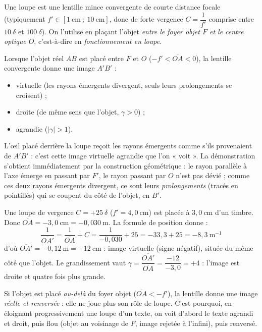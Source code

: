 \documentclass[11pt]{article}
\newcommand{\cle}[1]{{\popxbold\color{popdark}#1}}
\begin{document}
\begin{definition}[La loupe]
Une \cle{loupe} est une lentille mince \cle{convergente} de courte distance focale (typiquement $f' \in [1\ \text{cm}\ ;\ 10\ \text{cm}]$, donc de forte vergence $C = \dfrac{1}{f'}$ comprise entre $10\ \delta$ et $100\ \delta$). On l'utilise en plaçant l'objet \emph{entre le foyer objet $F$ et le centre optique $O$}, c'est-à-dire en \emph{fonctionnement en loupe}.
\end{definition}

\begin{propriete}
Lorsque l'objet réel $AB$ est placé entre $F$ et $O$ ($-f' < \overline{OA} < 0$), la lentille convergente donne une image $A'B'$ :
\begin{itemize}
\item \cle{virtuelle} (les rayons émergents divergent, seuls leurs prolongements se croisent) ;
\item \cle{droite} (de même sens que l'objet, $\gamma > 0$) ;
\item \cle{agrandie} ($|\gamma| > 1$).
\end{itemize}
L'œil placé derrière la loupe reçoit les rayons émergents comme s'ils provenaient de $A'B'$ : c'est cette image virtuelle agrandie que l'on « voit ». La démonstration s'obtient immédiatement par la construction géométrique : le rayon parallèle à l'axe émerge en passant par $F'$, le rayon passant par $O$ n'est pas dévié ; comme ces deux rayons émergents divergent, ce sont leurs \emph{prolongements} (tracés en pointillés) qui se coupent du côté de l'objet, en $B'$.
\end{propriete}

\begin{exemplebox}
Une loupe de vergence $C = +25\ \delta$ ($f' = 4{,}0\ \text{cm}$) est placée à $3{,}0\ \text{cm}$ d'un timbre. Donc $\overline{OA} = -3{,}0\ \text{cm} = -0{,}030\ \text{m}$. La formule de position donne :
\[ \frac{1}{\overline{OA'}} = \frac{1}{\overline{OA}} + C = \frac{1}{-0{,}030} + 25 = -33{,}3 + 25 = -8{,}3\ \text{m}^{-1} \]
d'où $\overline{OA'} = -0{,}12\ \text{m} = -12\ \text{cm}$ : image virtuelle (signe négatif), située du même côté que l'objet. Le grandissement vaut $\gamma = \dfrac{\overline{OA'}}{\overline{OA}} = \dfrac{-12}{-3{,}0} = +4$ : l'image est droite et quatre fois plus grande.
\end{exemplebox}

\begin{attention}
Si l'objet est placé \emph{au-delà} du foyer objet ($\overline{OA} < -f'$), la lentille donne une image \emph{réelle et renversée} : elle ne joue plus son rôle de loupe. C'est pourquoi, en éloignant progressivement une loupe d'un texte, on voit d'abord le texte agrandi et droit, puis flou (objet au voisinage de $F$, image rejetée à l'infini), puis renversé.
\end{attention}
\end{document}
